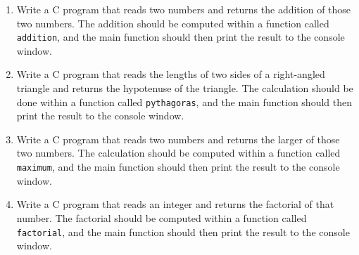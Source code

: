\documentclass{pass}
\begin{document}
\begin{enumerate}[resume]
\item Write a C program that reads two numbers and returns the addition of those two numbers. The addition should be computed within a function called \texttt{addition}, and the main function should then print the result to the console window. \\[12pt]

\item Write a C program that reads the lengths of two sides of a right-angled triangle and returns the hypotenuse of the triangle. The calculation should be done within a function called \texttt{pythagoras}, and the main function should then print the result to the console window. \\[12pt]

\item Write a C program that reads two numbers and returns the larger of those two numbers. The calculation should be computed within a function called \texttt{maximum}, and the main function should then print the result to the console window. \\[12pt]

\item Write a C program that reads an integer and returns the factorial of that number. The factorial should be computed within a function called \texttt{factorial}, and the main function should then print the result to the console window. \\[12pt]


\end{enumerate}
\end{document}

